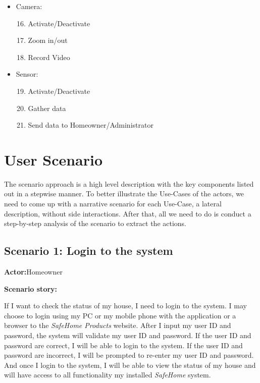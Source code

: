 \documentclass[twoside,11pt]{article}
\begin{document}
\begin{itemize}
    \item Camera:
          \begin{enumerate}
              \setcounter{enumi}{15}
              \item Activate/Deactivate
              \item Zoom in/out
              \item Record Video
          \end{enumerate}
    \item Sensor:
          \begin{enumerate}
              \setcounter{enumi}{18}
              \item Activate/Deactivate
              \item Gather data
              \item Send data to Homeowner/Administrator
          \end{enumerate}
\end{itemize}
\newpage

\section{User Scenario}

The scenario approach is a high level description with the key components listed out in a stepwise manner\cite{Lance2018Creating}. To better illustrate the Use-Cases of the actors, we need to come up with a narrative scenario for each Use-Case, a lateral description, without side interactions. After that, all we need to do is conduct a step-by-step analysis of the scenario to extract the actions.


\subsection{Scenario 1: Login to the system}

\textbf{Actor:}Homeowner

\textbf{Scenario story:}

If I want to check the status of my house, I need to login to the system. I may choose to login using my PC or my mobile phone with the application or a browser to the \emph{SafeHome Products} website. After I input my user ID and password, the system will validate my user ID and password. If the user ID and password are correct, I will be able to login to the system. If the user ID and password are incorrect, I will be prompted to re-enter my user ID and password. And once I login to the system, I will be able to view the status of my house and will have access to all functionality my installed \emph{SafeHome} system.
\end{document}
